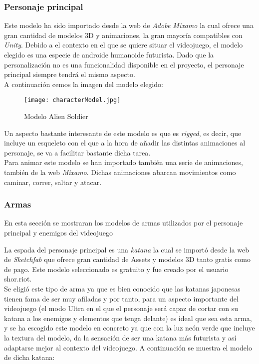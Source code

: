 
\subsubsection{Personaje principal}
Este modelo ha sido importado desde la web de \textit{Adobe Mixamo} \cite{Mixamo} la cual ofrece una gran cantidad de modelos 3D
y animaciones, la gran mayoría compatibles con \textit{Unity}. Debido a el contexto en el que se quiere situar
el videojuego, el modelo elegido es una especie de androide humanoide futurista. Dado que la personalización no es una funcionalidad disponible en el proyecto, el personaje principal siempre tendrá el mismo aspecto. \\
A continuación cemos la imagen del modelo elegido: 

\begin{figure}[htbp]
\centering
\texttt{[image: characterModel.jpg]}
\caption{Modelo Alien Soldier}
\end{figure}

Un aspecto bastante interesante de este modelo es que es \textit{rigged}, es decir, que incluye
un esqueleto con el que a la hora de añadir las distintas animaciones al personaje, se va a facilitar bastante dicha tarea. \\

Para animar este modelo se han importado también una serie de animaciones, también de la web
\textit{Mixamo}. Dichas animaciones abarcan movimientos como caminar, correr, saltar y atacar.

\subsubsection{Armas}
En esta sección se mostraran los modelos de armas utilizados por el personaje principal y enemigos del videojuego

La espada del personaje principal es una \textit{katana} la cual se importó desde la web de 
\textit{Sketchfab} \cite{Sketchfab} que ofrece gran cantidad de Assets y modelos 3D tanto gratis como de pago.
Este modelo seleccionado es gratuito y fue creado por el usuario shor.riot. \\

Se eligió este tipo de arma ya que es bien conocido
que las katanas japonesas tienen fama de ser muy afiladas y por tanto, para un aspecto importante del videojuego 
(el modo Ultra en el que el personaje será capaz de cortar con su katana a los enemigos y elementos que tenga delante) es ideal que sea esta arma, y se
ha escogido este modelo en concreto ya que con la luz neón verde que incluye la textura del modelo,
da la sensación de ser una katana más futurista y así adaptarse mejor al contexto del videojuego. A continuación se muestra el modelo
de dicha katana: 

